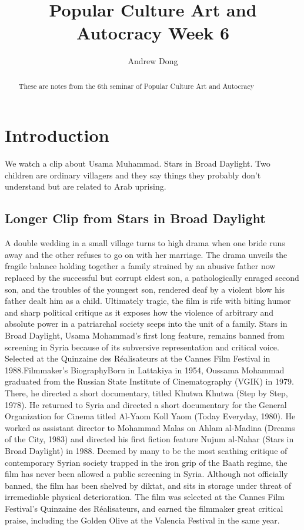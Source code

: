 \documentclass{article}
\begin{document}
\title{Popular Culture Art and Autocracy Week 6}
\author{Andrew Dong}

\maketitle

\begin{abstract}
These are notes from the 6th seminar of Popular Culture Art and Autocracy\end{abstract}

\section{Introduction}
We watch a clip about Usama Muhammad.  Stars in Broad Daylight.  Two children are ordinary villagers and they say things they probably don't understand but are related to Arab uprising.  


\subsection{Longer Clip from Stars in Broad Daylight}

A double wedding in a small village turns to high drama when one bride runs away and the other refuses to go on with her marriage. The drama unveils the fragile balance holding together a family strained by an abusive father now replaced by the successful but corrupt eldest son, a pathologically enraged second son, and the troubles of the youngest son, rendered deaf by a violent blow his father dealt him as a child. Ultimately tragic, the film is rife with biting humor and sharp political critique as it exposes how the violence of arbitrary and absolute power in a patriarchal society seeps into the unit of a family. Stars in Broad Daylight, Usama Mohammad’s first long feature, remains banned from screening in Syria because of its subversive representation and critical voice. Selected at the Quinzaine des Réalisateurs at the Cannes Film Festival in 1988.Filmmaker’s BiographyBorn in Lattakiya in 1954, Oussama Mohammad graduated from the Russian State Institute of Cinematography (VGIK) in 1979. There, he directed a short documentary, titled Khutwa Khutwa (Step by Step, 1978). He returned to Syria and directed a short documentary for the General Organization for Cinema titled Al-Yaom Koll Yaom (Today Everyday, 1980). He worked as assistant director to Mohammad Malas on Ahlam al-Madina (Dreams of the City, 1983) and directed his first fiction feature Nujum al-Nahar (Stars in Broad Daylight) in 1988. Deemed by many to be the most scathing critique of contemporary Syrian society trapped in the iron grip of the Baath regime, the film has never been allowed a public screening in Syria. Although not officially banned, the film has been shelved by diktat, and sits in storage under threat of irremediable physical deterioration. The film was selected at the Cannes Film Festival’s Quinzaine des Réalisateurs, and earned the filmmaker great critical praise, including the Golden Olive at the Valencia Festival in the same year. 
\end{document}
